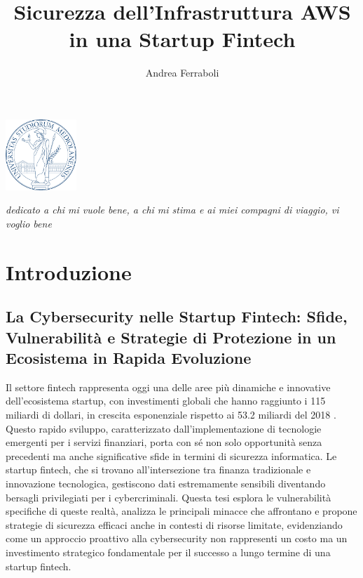 \documentclass[a4paper,12pt]{report}
\begin{document}
\begin{center}
        \includegraphics[width=0.2\textwidth]{images/Unimi-logo.png}
        \vspace{1cm}
\end{center}

\title{Sicurezza dell'Infrastruttura AWS in una Startup Fintech}
\author{Andrea Ferraboli}

\beforepreface

\prefacesection{}
{\hfill \Large {\sl dedicato a chi mi vuole bene, a chi mi stima e ai miei compagni di viaggio, vi voglio bene}}

\tableofcontents
\chapter{Introduzione}

\section*{La Cybersecurity nelle Startup Fintech: Sfide, Vulnerabilità e Strategie di Protezione in un Ecosistema in Rapida Evoluzione}

Il settore fintech rappresenta oggi una delle aree più dinamiche e innovative dell'ecosistema startup, con investimenti globali che hanno raggiunto i 115 miliardi di dollari, in crescita esponenziale rispetto ai 53.2 miliardi del 2018 \cite{gartnerFintech}. Questo rapido sviluppo, caratterizzato dall'implementazione di tecnologie emergenti per i servizi finanziari, porta con sé non solo opportunità senza precedenti ma anche significative sfide in termini di sicurezza informatica. Le startup fintech, che si trovano all'intersezione tra finanza tradizionale e innovazione tecnologica, gestiscono dati estremamente sensibili diventando bersagli privilegiati per i cybercriminali. Questa tesi esplora le vulnerabilità specifiche di queste realtà, analizza le principali minacce che affrontano e propone strategie di sicurezza efficaci anche in contesti di risorse limitate, evidenziando come un approccio proattivo alla cybersecurity non rappresenti un costo ma un investimento strategico fondamentale per il successo a lungo termine di una startup fintech.
\end{document}
